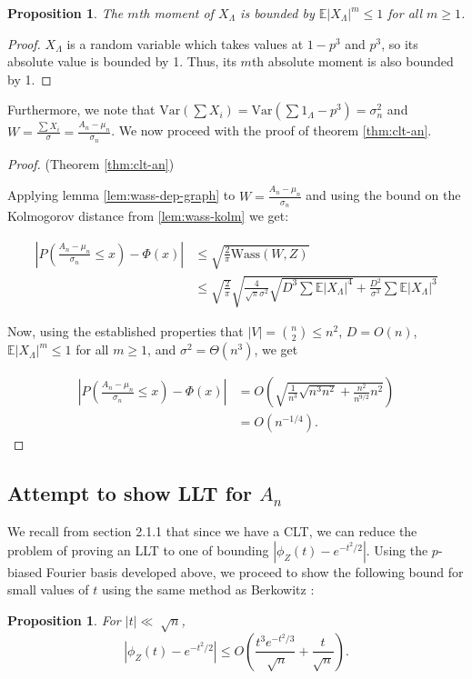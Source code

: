 \documentclass[12pt]{article} %
\newcommand{\p}[1]{\left(#1\right)}
\newcommand{\abs}[1]{\left\lvert#1\right\rvert}
\newcommand{\Var}{\mathrm{Var}}
\newcommand{\Wass}{\mathrm{Wass}}
\newcommand{\E}{\mathbb{E}}
\newtheorem{prop}[thm]{Proposition}
\theoremstyle{definition}
\theoremstyle{definition}
\begin{document}
\begin{prop}
The $m$th moment of $X_\Lambda$ is bounded by $\E|X_\Lambda|^m \leq 1$ for all $m \geq 1$.
\end{prop}

\begin{proof}

$X_\Lambda$ is a random variable which takes values at $1-p^3$ and $p^3$, so its absolute value is bounded by 1. Thus, its $m$th absolute moment is also bounded by 1.

\end{proof}

Furthermore, we note that $\Var\p{\sum X_i} = \Var\p{\sum 1_\Lambda - p^3} = \sigma_n^2$ and $W = \frac{\sum X_i}{\sigma} = \frac{A_n - \mu_n}{\sigma_n}$. We now proceed with the proof of theorem \ref{thm:clt-an}.

\begin{proof}(Theorem \ref{thm:clt-an})

Applying lemma \ref{lem:wass-dep-graph} to $W = \frac{A_n - \mu_n}{\sigma_n}$ and using the bound on the Kolmogorov distance from \ref{lem:wass-kolm} we get:

\begin{align*}
\abs{P\p{\frac{A_n - \mu_n}{\sigma_n} \leq x} - \Phi(x)} &\leq \sqrt{\frac{2}{\pi} \Wass(W, Z)} \\
&\leq \sqrt{\frac{2}{\pi}}\sqrt{\frac{4}{\sqrt{\pi}\sigma^2} \sqrt{D^3 \sum {\E{|X_\Lambda|}^4}} 
+ \frac{D^2}{\sigma^3} \sum {\E{|X_\Lambda|}^3}}
\end{align*}

Now, using the established properties that $|V| = \binom{n}{2} \leq n^2$, $D = O(n)$, $\E{|X_\Lambda|^m} \leq 1$ for all $m \geq 1$, and $\sigma^2 = \Theta(n^3)$, we get

\begin{align*}
\abs{P\p{\frac{A_n - \mu_n}{\sigma_n} \leq x} - \Phi(x)} &= O\p{\sqrt{\frac{1}{n^3} \sqrt{n^3 n^2} + \frac{n^2}{n^{9/2}} n^2}} \\
&= O(n^{-1/4}).
\end{align*}

\end{proof}


\subsection{Attempt to show LLT for $A_n$}
We recall from section 2.1.1 that since we have a CLT, we can reduce the problem of proving an LLT to one of bounding $\abs{\phi_Z(t) - e^{-t^2/2}}$. 
Using the $p$-biased Fourier basis developed above, we proceed to show the following bound for small values of $t$ using the same method as Berkowitz \cite{Berkowitz17}: 
\begin{prop}
For $|t| \ll \sqrt[]{n}$, \[ \abs{\phi_Z(t) - e^{-t^2/2}} \leq O\left(\frac{t^3e^{-t^2/3}}{\sqrt[]{n}} + \frac{t}{\sqrt{n}}\right). \]
\end{prop}
\end{document}
